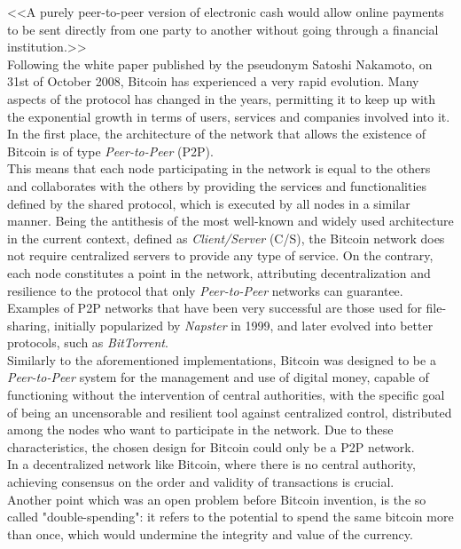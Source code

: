 <<A purely peer-to-peer version of electronic cash would allow online
payments to be sent directly from one party to another without going through a
financial institution.>>\\
Following the white paper published by the pseudonym Satoshi Nakamoto, on 31st of October 2008, Bitcoin has experienced a very rapid evolution. Many aspects of the protocol has changed in the years, permitting it to keep up with the exponential growth in terms of users, services and companies involved into it.\\
In the first place, the architecture of the network that allows the existence of Bitcoin is of type \textit{Peer-to-Peer} (P2P).\\This means that each node participating in the network is equal to the others and collaborates with the others by providing the services and functionalities defined by the shared protocol, which is executed by all nodes in a similar manner. Being the antithesis of the most well-known and widely used architecture in the current context, defined as \textit{Client/Server} (C/S), the Bitcoin network does not require centralized servers to provide any type of service. On the contrary, each node constitutes a point in the network, attributing decentralization and resilience to the protocol that only \textit{Peer-to-Peer} networks can guarantee. Examples of P2P networks that have been very successful are those used for file-sharing, initially popularized by \textit{Napster} in 1999, and later evolved into better protocols, such as \textit{BitTorrent}.\\
Similarly to the aforementioned implementations, Bitcoin was designed to be a \textit{Peer-to-Peer} system for the management and use of digital money, capable of functioning without the intervention of central authorities, with the specific goal of being an uncensorable and resilient tool against centralized control, distributed among the nodes who want to participate in the network. Due to these characteristics, the chosen design for Bitcoin could only be a P2P network.\\
In a decentralized network like Bitcoin, where there is no central authority, achieving consensus on the order and validity of transactions is crucial.\\
Another point which was an open problem before Bitcoin invention, is the so called "double-spending": it refers to the potential to spend the same bitcoin more than once, which would undermine the integrity and value of the currency.\\
